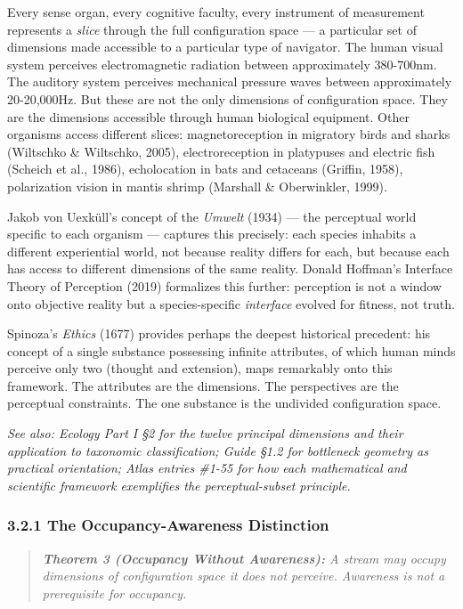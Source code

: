 Every sense organ, every cognitive faculty, every instrument of measurement represents a \textit{slice} through the full configuration space — a particular set of dimensions made accessible to a particular type of navigator. The human visual system perceives electromagnetic radiation between approximately 380-700nm. The auditory system perceives mechanical pressure waves between approximately 20-20,000Hz. But these are not the only dimensions of configuration space. They are the dimensions accessible through human biological equipment. Other organisms access different slices: magnetoreception in migratory birds and sharks (Wiltschko \& Wiltschko, 2005), electroreception in platypuses and electric fish (Scheich et al., 1986), echolocation in bats and cetaceans (Griffin, 1958), polarization vision in mantis shrimp (Marshall \& Oberwinkler, 1999).


Jakob von Uexküll's concept of the \textit{Umwelt} (1934) — the perceptual world specific to each organism — captures this precisely: each species inhabits a different experiential world, not because reality differs for each, but because each has access to different dimensions of the same reality. Donald Hoffman's Interface Theory of Perception (2019) formalizes this further: perception is not a window onto objective reality but a species-specific \textit{interface} evolved for fitness, not truth.


Spinoza's \textit{Ethics} (1677) provides perhaps the deepest historical precedent: his concept of a single substance possessing infinite attributes, of which human minds perceive only two (thought and extension), maps remarkably onto this framework. The attributes are the dimensions. The perspectives are the perceptual constraints. The one substance is the undivided configuration space.


\textit{See also: Ecology Part I §2 for the twelve principal dimensions and their application to taxonomic classification; Guide §1.2 for bottleneck geometry as practical orientation; Atlas entries \#1-55 for how each mathematical and scientific framework exemplifies the perceptual-subset principle.}


\subsubsection*{3.2.1 The Occupancy-Awareness Distinction}


\begin{quote}
\itshape
\textbf{Theorem 3 (Occupancy Without Awareness):} \textit{A stream may occupy dimensions of configuration space it does not perceive. Awareness is not a prerequisite for occupancy.}
\end{quote}


